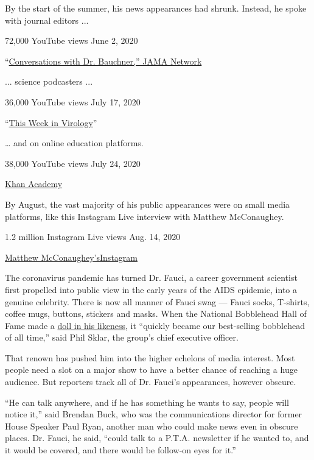 By the start of the summer, his news appearances had shrunk. Instead, he
spoke with journal editors ...

72,000 YouTube views \textbar{} June 2, 2020

``\href{https://www.youtube.com/watch?time_continue=20\&v=3MH-3ICY-N4\&feature=emb_logo}{Conversations
with Dr. Bauchner,'' JAMA Network}

... science podcasters ...

36,000 YouTube views \textbar{} July 17, 2020

``\href{https://bit.ly/3fznojs}{This Week in Virology}''

\ldots{} and on online education platforms.

38,000 YouTube views \textbar{} July 24, 2020

\href{https://www.youtube.com/watch?v=asVN55SS9T0}{Khan Academy}

By August, the vast majority of his public appearances were on small
media platforms, like this Instagram Live interview with Matthew
McConaughey.

1.2 million Instagram Live views \textbar{} Aug. 14, 2020

\href{https://www.instagram.com/p/CD2WoXupHV-/}{Matthew
McConaughey's}\href{https://www.instagram.com/p/CD2WoXupHV-/}{Instagram}

The coronavirus pandemic has turned Dr. Fauci, a career government
scientist first propelled into public view in the early years of the
AIDS epidemic, into a genuine celebrity. There is now all manner of
Fauci swag --- Fauci socks, T-shirts, coffee mugs, buttons, stickers and
masks. When the National Bobblehead Hall of Fame made a
\href{https://store.bobbleheadhall.com/collections/featured-product/products/drfauci}{doll
in his likeness}, it ``quickly became our best-selling bobblehead of all
time,'' said Phil Sklar, the group's chief executive officer.

That renown has pushed him into the higher echelons of media interest.
Most people need a slot on a major show to have a better chance of
reaching a huge audience. But reporters track all of Dr. Fauci's
appearances, however obscure.

``He can talk anywhere, and if he has something he wants to say, people
will notice it,'' said Brendan Buck, who was the communications director
for former House Speaker Paul Ryan, another man who could make news even
in obscure places. Dr. Fauci, he said, ``could talk to a P.T.A.
newsletter if he wanted to, and it would be covered, and there would be
follow-on eyes for it.''


